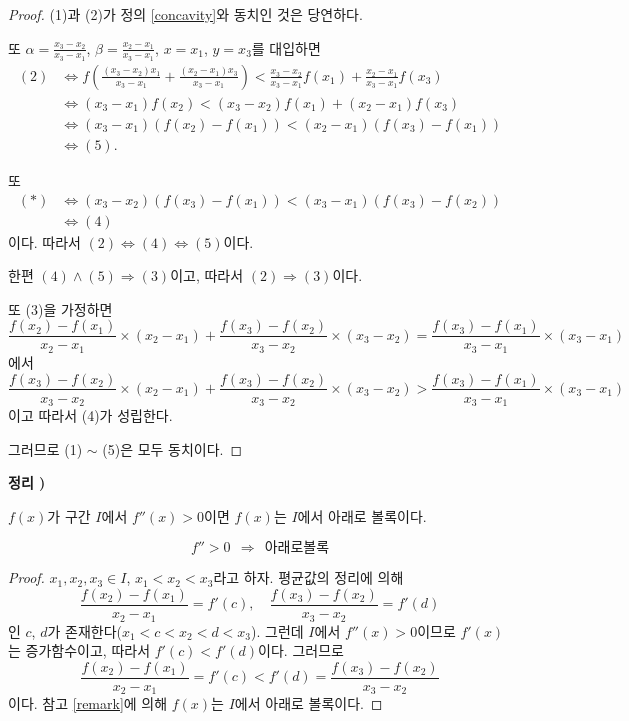 \documentclass{article}
\newcounter{num}
\newcommand{\theo}[1]
{\bigskip\noindent\refstepcounter{num}\textbf{정리 \arabic{num}) #1}\par}
\newcommand{\bb}{
\begin{mdframed}[skipabove=10pt,skipbelow=10pt, leftmargin=70pt, rightmargin=70pt]}
\newcommand{\eb}{\end{mdframed}}
\begin{document}
\begin{proof}
(1)과 (2)가 정의 \ref{concavity}와 동치인 것은 당연하다.

또 \(\alpha=\frac{x_3-x_2}{x_3-x_1}\), \(\beta=\frac{x_2-x_1}{x_3-x_1}\), \(x=x_1\), \(y=x_3\)를 대입하면
\begin{align*}
(2)
&\iff f\left(\frac{(x_3-x_2)x_1}{x_3-x_1}+\frac{(x_2-x_1)x_3}{x_3-x_1}\right)
<\frac{x_3-x_2}{x_3-x_1}f(x_1)+\frac{x_2-x_1}{x_3-x_1}f(x_3)\\
&\iff (x_3-x_1)f(x_2)<(x_3-x_2)f(x_1)+(x_2-x_1)f(x_3)\tag{\(\ast\)}\\
&\iff (x_3-x_1)(f(x_2)-f(x_1))<(x_2-x_1)(f(x_3)-f(x_1))\\
&\iff (5).
\end{align*}

또
\begin{align*}
(\ast)
&\iff (x_3-x_2)(f(x_3)-f(x_1))<(x_3-x_1)(f(x_3)-f(x_2))\\
&\iff (4)
\end{align*}
이다.
따라서 \((2)\Leftrightarrow(4)\Leftrightarrow(5)\)이다.

한편 \((4)\wedge(5)\Rightarrow(3)\)이고, 따라서 \((2)\Rightarrow(3)\)이다.

또 (3)을 가정하면
\[\frac{f(x_2)-f(x_1)}{x_2-x_1}\times(x_2-x_1)
+
\frac{f(x_3)-f(x_2)}{x_3-x_2}\times(x_3-x_2)
=
\frac{f(x_3)-f(x_1)}{x_3-x_1}\times(x_3-x_1)\]
에서
\[\frac{f(x_3)-f(x_2)}{x_3-x_2}\times(x_2-x_1)
+
\frac{f(x_3)-f(x_2)}{x_3-x_2}\times(x_3-x_2)
>
\frac{f(x_3)-f(x_1)}{x_3-x_1}\times(x_3-x_1)\]
이고 따라서 (4)가 성립한다.

그러므로 (1) \(\sim\) (5)은 모두 동치이다.
\end{proof}

\newpage

\theo{}\label{concavity1}
\(f(x)\)가 구간 \(I\)에서 \(f''(x)>0\)이면 \(f(x)\)는 \(I\)에서 아래로 볼록이다.

\bb
\[f''>0\:\:\Rightarrow\:\:아래로볼록\]
\eb

\begin{proof}
\(x_1,x_2,x_3\in I\), \(x_1<x_2<x_3\)라고 하자.
평균값의 정리에 의해 
\[\frac{f(x_2)-f(x_1)}{x_2-x_1}=f'(c),\quad\frac{f(x_3)-f(x_2)}{x_3-x_2}=f'(d)\]
인 \(c\), \(d\)가 존재한다(\(x_1<c<x_2<d<x_3\)).
그런데 \(I\)에서 \(f''(x)>0\)이므로 \(f'(x)\)는 증가함수이고, 따라서 \(f'(c)<f'(d)\)이다.
그러므로
\[\frac{f(x_2)-f(x_1)}{x_2-x_1}=f'(c)<f'(d)=\frac{f(x_3)-f(x_2)}{x_3-x_2}\]
이다.
참고 \ref{remark}에 의해 \(f(x)\)는 \(I\)에서 아래로 볼록이다.
\end{proof}
\end{document}

